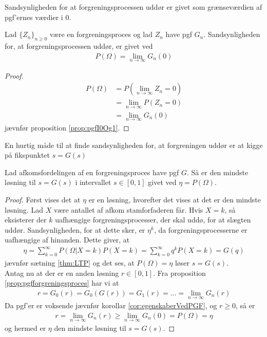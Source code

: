 Sandsynligheden for at forgreningsprocessen uddør er givet som grænseværdien af pgf'ernes værdier i $0$.
\begin{prop}
Lad $\{Z_n\}_{n \geq 0}$ være en forgreningsproces og lad $Z_n$ have pgf $G_n$. Sandsynligheden for, at forgreningsprocessen uddør, er givet ved
\begin{align*}
    P(\Omega)=\lim_{n\rightarrow\infty}G_n(0)
\end{align*}
\end{prop}
\begin{proof}
\begin{align*}
    P(\Omega)&=P\left(\lim_{n\rightarrow\infty}Z_n = 0\right)\\
    &=\lim_{n\rightarrow\infty}P(Z_n = 0)\\
    &=\lim_{n\rightarrow\infty}G_n(0)
\end{align*}
jævnfør proposition \ref{prop:pgfI0Og1}.
\end{proof}

En hurtig måde til at finde sandsynligheden for, at forgreningen uddør er at kigge på fikspunktet $s=G(s)$  
\begin{prop} \label{prop:prop8.7}%
Lad afkomsfordelingen af en forgreningsproces have pgf $G$. Så er den mindste løsning til $s=G(s)$ i intervallet $s\in[0,1]$ givet ved $\eta=P(\Omega)$.
\end{prop}
\begin{proof}
Først vises det at $\eta$ er en løsning, hvorefter det vises at det er den mindste løsning.
Lad $X$ være antallet af afkom stamforfaderen får.
Hvis $X=k$, så eksisterer der $k$ uafhængige forgreningsprocesser, der skal uddø, for at slægten uddør.
Sandsynligheden, for at dette sker, er $\eta^k$, da forgreningsprocesserne er uafhængige af hinanden.
Dette giver, at 
\begin{align*}
    \eta=\sum_{k=0}^{\infty}P(\Omega|X=k)P(X=k)=\sum_{k=0}^{\infty}q^kP(X=k)=G(q)
\end{align*}
jævnfør sætning \ref{thm:LTP} og det ses, at $P(\Omega)=\eta$ løser $s=G(s)$.\\ 
Antag nu at der er en anden løsning $r\in[0,1]$.
Fra proposition \ref{prop:pgfforgreningsproces} har vi at
\begin{align*}
    r=G_0(r)=G_0(G(r))=G_1(r)=\dots=\lim_{n\to\infty}G_n(r)
\end{align*}
Da pgf'er er voksende jævnfør korollar \ref{cor:egenskaberVedPGF}, og $r\geq 0$, så er
\begin{align*}
    r = \lim_{n\to\infty}G_n(r) \geq \lim_{n\to\infty}G_n(0)=P(\Omega)=\eta
\end{align*}
og hermed er $\eta$ den mindste løsning til $s=G(s)$.
\end{proof}


